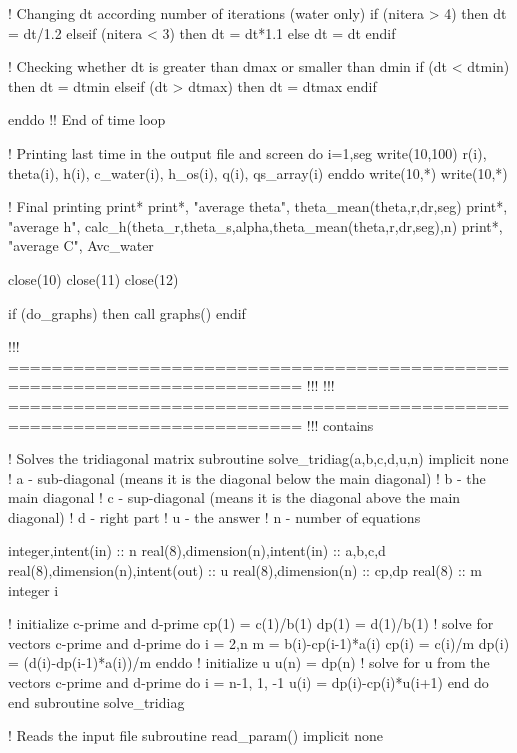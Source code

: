   ! Changing dt according number of iterations (water only)
  if (nitera > 4) then
    dt = dt/1.2
  elseif (nitera < 3) then
    dt = dt*1.1
  else
    dt = dt
  endif
  
  ! Checking whether dt is greater than dmax or smaller than dmin
  if (dt < dtmin) then
    dt = dtmin
  elseif (dt > dtmax) then
    dt = dtmax
  endif


enddo   !! End of time loop

! Printing last time in the output file and screen
do i=1,seg
  write(10,100) r(i), theta(i), h(i), c_water(i), h_os(i), q(i), qs_array(i)
enddo
write(10,*)
write(10,*)

! Final printing
print*
print*, "average theta", theta_mean(theta,r,dr,seg)
print*, "average h", calc_h(theta_r,theta_s,alpha,theta_mean(theta,r,dr,seg),n)
print*, "average C", Avc_water

close(10)
close(11)
close(12)


if (do_graphs) then
  call graphs()
endif

!!! ========================================================================= !!!
!!! ========================================================================= !!!
contains

! Solves the tridiagonal matrix
subroutine solve_tridiag(a,b,c,d,u,n)
      implicit none
!	 a - sub-diagonal (means it is the diagonal below the main diagonal)
!	 b - the main diagonal
!	 c - sup-diagonal (means it is the diagonal above the main diagonal)
!	 d - right part
!	 u - the answer
!	 n - number of equations
 
        integer,intent(in) :: n
        real(8),dimension(n),intent(in) :: a,b,c,d
        real(8),dimension(n),intent(out) :: u
        real(8),dimension(n) :: cp,dp
        real(8) :: m
        integer i
 
! initialize c-prime and d-prime
        cp(1) = c(1)/b(1)
        dp(1) = d(1)/b(1)
! solve for vectors c-prime and d-prime
         do i = 2,n
           m = b(i)-cp(i-1)*a(i)
           cp(i) = c(i)/m
           dp(i) = (d(i)-dp(i-1)*a(i))/m
         enddo
! initialize u
         u(n) = dp(n)
! solve for u from the vectors c-prime and d-prime
        do i = n-1, 1, -1
          u(i) = dp(i)-cp(i)*u(i+1)
        end do
end subroutine solve_tridiag

! Reads the input file
subroutine read_param()
implicit none

